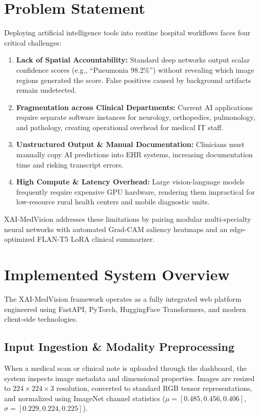 \documentclass[conference]{IEEEtran}
\begin{document}
\section{Problem Statement}
Deploying artificial intelligence tools into routine hospital workflows faces four critical challenges:
\begin{enumerate}
    \item \textbf{Lack of Spatial Accountability:} Standard deep networks output scalar confidence scores (e.g., ``Pneumonia 98.2\%'') without revealing which image regions generated the score. False positives caused by background artifacts remain undetected.
    \item \textbf{Fragmentation across Clinical Departments:} Current AI applications require separate software instances for neurology, orthopedics, pulmonology, and pathology, creating operational overhead for medical IT staff.
    \item \textbf{Unstructured Output & Manual Documentation:} Clinicians must manually copy AI predictions into EHR systems, increasing documentation time and risking transcript errors.
    \item \textbf{High Compute & Latency Overhead:} Large vision-language models frequently require expensive GPU hardware, rendering them impractical for low-resource rural health centers and mobile diagnostic units.
\end{enumerate}

XAI-MedVision addresses these limitations by pairing modular multi-specialty neural networks with automated Grad-CAM saliency heatmaps and an edge-optimized FLAN-T5 LoRA clinical summarizer.

\section{Implemented System Overview}
The XAI-MedVision framework operates as a fully integrated web platform engineered using FastAPI, PyTorch, HuggingFace Transformers, and modern client-side technologies.

\subsection{Input Ingestion & Modality Preprocessing}
When a medical scan or clinical note is uploaded through the dashboard, the system inspects image metadata and dimensional properties. Images are resized to $224 \times 224 \times 3$ resolution, converted to standard RGB tensor representations, and normalized using ImageNet channel statistics ($\mu = [0.485, 0.456, 0.406]$, $\sigma = [0.229, 0.224, 0.225]$).
\end{document}
